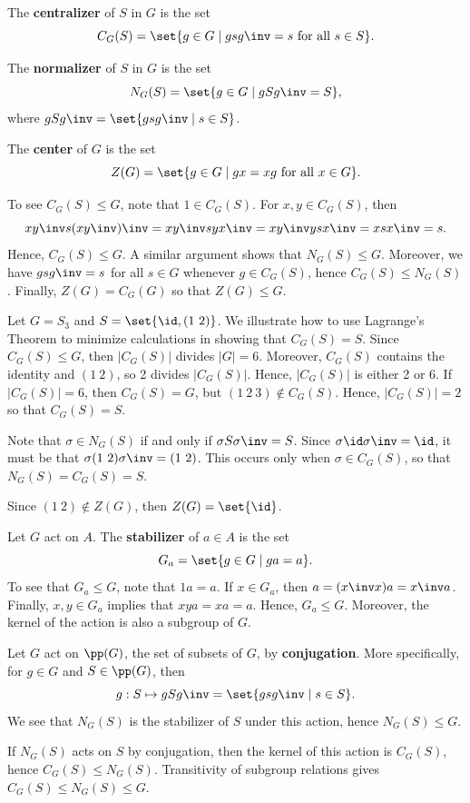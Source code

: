  The \textbf{centralizer} of $S$ in $G$ is the set
\[C_G(S) = \set{g \in G \mid gsg\inv = s \text{ for all } s \in S}.\]

 The \textbf{normalizer} of $S$ in $G$ is the set
\[N_G(S) = \set{g \in G \mid gSg\inv = S},\]
where $gSg\inv = \set{gsg\inv \mid s \in S}$.

 The \textbf{center} of $G$ is the set
\[Z(G) = \set{g \in G \mid gx = xg \text{ for all } x \in G}.\]

\note To see $C_G(S) \leq G$, note that $1 \in C_G(S)$. For $x, y \in C_G(S)$, then
\[xy\inv s(xy\inv)\inv = xy\inv syx\inv = xy\inv ysx\inv = xsx\inv = s.\]
Hence, $C_G(S) \leq G$. A similar argument shows that $N_G(S) \leq G$. Moreover, we have $gsg\inv = s$ for all $s \in G$ whenever $g \in C_G(S)$, hence $C_G(S) \leq N_G(S)$. Finally, $Z(G) = C_G(G)$ so that $Z(G) \leq G$.

\ex Let $G = S_3$ and $S = \set{\id, (1\ 2)}$. We illustrate how to use Lagrange's Theorem to minimize calculations in showing that $C_G(S) = S$. Since $C_G(S) \leq G$, then $|C_G(S)|$ divides $|G| = 6$. Moreover, $C_G(S)$ contains the identity and $(1\ 2)$, so 2 divides $|C_G(S)|$. Hence, $|C_G(S)|$ is either 2 or 6. If $|C_G(S)| = 6$, then $C_G(S) = G$, but $(1\ 2\ 3) \not\in C_G(S)$. Hence, $|C_G(S)| = 2$ so that $C_G(S) = S$.

Note that $\sigma \in N_G(S)$ if and only if $\sigma S \sigma\inv = S$. Since $\sigma \id \sigma\inv = \id$, it must be that $\sigma(1\ 2)\sigma\inv = (1\ 2)$. This occurs only when $\sigma \in C_G(S)$, so that $N_G(S) = C_G(S) = S$.

Since $(1\ 2) \not\in Z(G)$, then $Z(G) = \set{\id}$.

 Let $G$ act on $A$. The \textbf{stabilizer} of $a \in A$ is the set
\[G_a = \set{g \in G \mid ga = a}.\]
To see that $G_a \leq G$, note that $1a = a$. If $x \in G_a$, then $a = (x\inv x)a = x\inv a$. Finally, $x, y \in G_a$ implies that $xya = xa = a$. Hence, $G_a \leq G$. Moreover, the kernel of the action is also a subgroup of $G$.

 Let $G$ act on $\pp(G)$, the set of subsets of $G$, by \textbf{conjugation}. More specifically, for $g \in G$ and $S \in \pp(G)$, then
\[g : S \mapsto gSg\inv = \set{gsg\inv \mid s \in S}.\]
We see that $N_G(S)$ is the stabilizer of $S$ under this action, hence $N_G(S) \leq G$.

If $N_G(S)$ acts on $S$ by conjugation, then the kernel of this action is $C_G(S)$, hence $C_G(S) \leq N_G(S)$. Transitivity of subgroup relations gives $C_G(S) \leq N_G(S) \leq G$.

